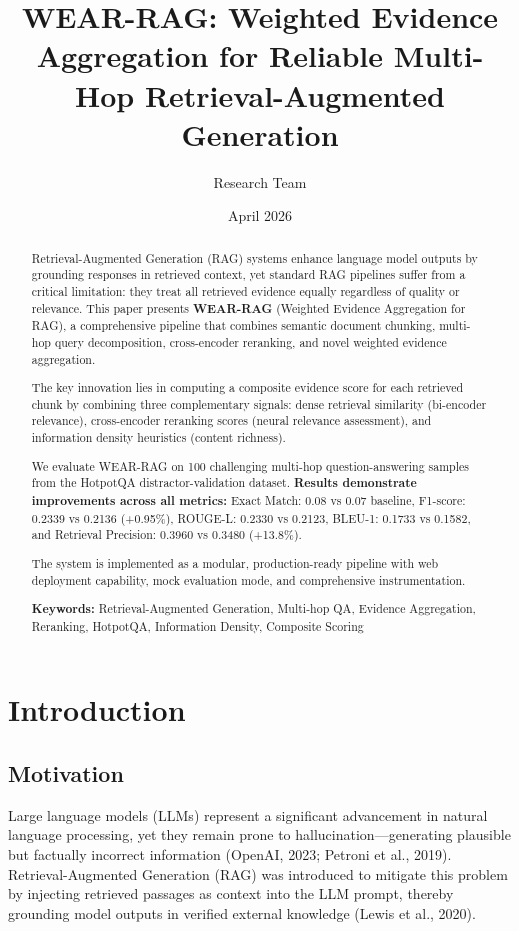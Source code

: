 \documentclass[twocolumn,11pt]{article}
\title{\textbf{WEAR-RAG: Weighted Evidence Aggregation for Reliable Multi-Hop Retrieval-Augmented Generation}}
\author{Research Team}
\date{April 2026}
\begin{document}
\maketitle

\begin{abstract}
Retrieval-Augmented Generation (RAG) systems enhance language model outputs by grounding responses in retrieved context, yet standard RAG pipelines suffer from a critical limitation: they treat all retrieved evidence equally regardless of quality or relevance. This paper presents \textbf{WEAR-RAG} (Weighted Evidence Aggregation for RAG), a comprehensive pipeline that combines semantic document chunking, multi-hop query decomposition, cross-encoder reranking, and novel weighted evidence aggregation. 

The key innovation lies in computing a composite evidence score for each retrieved chunk by combining three complementary signals: dense retrieval similarity (bi-encoder relevance), cross-encoder reranking scores (neural relevance assessment), and information density heuristics (content richness).

We evaluate WEAR-RAG on 100 challenging multi-hop question-answering samples from the HotpotQA distractor-validation dataset. \textbf{Results demonstrate improvements across all metrics:} Exact Match: 0.08 vs 0.07 baseline, F1-score: 0.2339 vs 0.2136 (+0.95\%), ROUGE-L: 0.2330 vs 0.2123, BLEU-1: 0.1733 vs 0.1582, and Retrieval Precision: 0.3960 vs 0.3480 (+13.8\%).

The system is implemented as a modular, production-ready pipeline with web deployment capability, mock evaluation mode, and comprehensive instrumentation.

\textbf{Keywords:} Retrieval-Augmented Generation, Multi-hop QA, Evidence Aggregation, Reranking, HotpotQA, Information Density, Composite Scoring
\end{abstract}

\section{Introduction}

\subsection{Motivation}

Large language models (LLMs) represent a significant advancement in natural language processing, yet they remain prone to hallucination---generating plausible but factually incorrect information (OpenAI, 2023; Petroni et al., 2019). Retrieval-Augmented Generation (RAG) was introduced to mitigate this problem by injecting retrieved passages as context into the LLM prompt, thereby grounding model outputs in verified external knowledge (Lewis et al., 2020).
\end{document}
